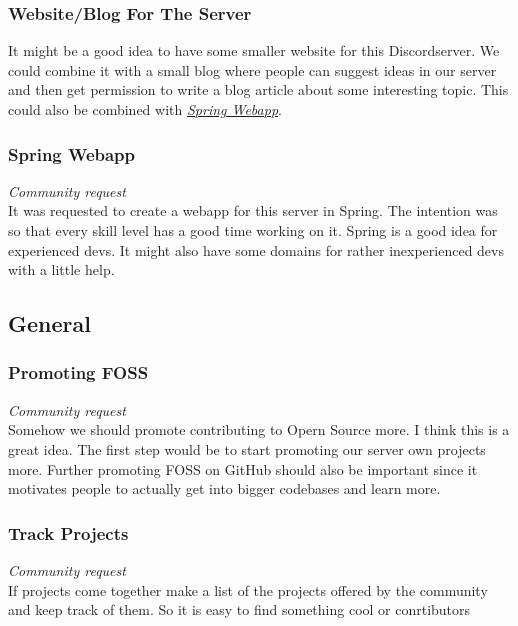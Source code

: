 \documentclass{article}
\newcommand{\refsection}[2]{\hyperref[#1]{\underline{\textit{#2}}}}
\begin{document}
    \subsubsection{Website/Blog For The Server}
    It might be a good idea to have some smaller website for this Discordserver. 
    We could combine it with a small blog where people can suggest ideas in our server and then get permission to write a blog article about some interesting topic.
    This could also be combined with \refsection{sec:springwebapp}{Spring Webapp}.

    \subsubsection{Spring Webapp}
    \label{sec:springwebapp}
    \textit{Community request} \\ \newline 
    It was requested to create a webapp for this server in Spring. 
    The intention was so that every skill level has a good time working on it. 
    Spring is a good idea for experienced devs. It might also have some domains for rather inexperienced devs with a little help.

    \subsection{General}

    \subsubsection{Promoting FOSS}
    \textit{Community request} \\ \newline 
    Somehow we should promote contributing to Opern Source more. 
    I think this is a great idea. 
    The first step would be to start promoting our server own projects more.
    Further promoting FOSS on GitHub should also be important since it motivates people to actually get into bigger codebases and learn more.

    \subsubsection{Track Projects}
    \textit{Community request} \\ \newline 
    If projects come together make a list of the projects offered by the community and keep track of them.
    So it is easy to find something cool or conrtibutors
    
\end{document}
